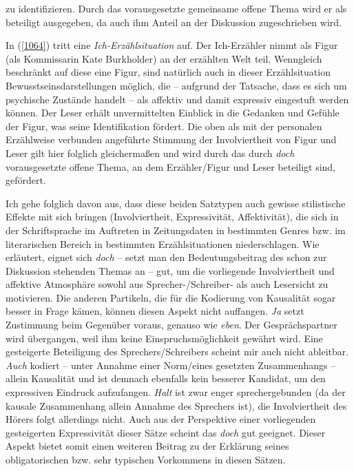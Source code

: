 {zu identifizieren. Durch das vorausgesetzte gemeinsame offene Thema wird er als beteiligt ausgegeben, da auch ihm Anteil an der Diskussion zugeschrieben wird.

In (\ref{1064}) tritt eine \textit{Ich-Erzählsituation} auf. Der  Ich-Erzähler nimmt als Figur (als Kommissarin Kate Burkholder) an der erzählten Welt teil. Wenngleich beschränkt auf diese eine Figur, sind natürlich auch in dieser Erzählsituation Bewusstseinsdarstellungen möglich, die – aufgrund der Tatsache, dass es sich um psychische Zustände handelt – als affektiv und damit expressiv eingestuft werden können. Der Leser erhält unvermittelten Einblick in die Gedanken und Gefühle der Figur, was seine Identifikation fördert. Die oben als mit der personalen Erzählweise verbunden angeführte Stimmung der Involviertheit von Figur und Leser gilt hier folglich gleichermaßen und wird durch das durch \textit{doch} vorausgesetzte offene Thema, an dem Erzähler/Figur und Leser beteiligt sind, gefördert.

Ich gehe folglich davon aus, dass diese beiden Satztypen auch gewisse stilistische Effekte mit sich bringen (Involviertheit, Expressivität, Affektivität), die sich in der Schriftsprache im Auftreten in Zeitungsdaten in bestimmten Genres bzw. im literarischen Bereich in bestimmten Erzählsituationen niederschlagen. Wie erläutert, eignet sich \textit{doch} – setzt man den Bedeutungsbeitrag des schon zur Diskussion stehenden Themas an – gut, um die vorliegende Involviertheit und affektive Atmosphäre sowohl aus Sprecher-/Schreiber- als auch Lesersicht zu motivieren. Die anderen Partikeln, die für die Kodierung von Kausalität sogar besser in Frage kämen, können diesen Aspekt nicht auffangen. \textit{Ja} setzt Zustimmung beim Gegenüber voraus, genauso wie \textit{eben}. Der Gesprächspartner wird übergangen, weil ihm keine Einspruchsmöglichkeit gewährt wird. Eine gesteigerte Beteiligung des Sprechers/Schreibers scheint mir auch nicht ableitbar. \textit{Auch} ko\-diert – unter Annahme einer Norm/eines gesetzten Zusammenhangs – allein Kausalität und ist demnach ebenfalls kein besserer Kandidat, um den expressiven Eindruck aufzufangen. \textit{Halt} ist zwar enger sprechergebunden (da der kausale Zusammenhang allein Annahme des Sprechers ist), die Involviertheit des Hörers folgt allerdings nicht. Auch aus der Perspektive einer vorliegenden gesteigerten Expressivität dieser Sätze scheint das \textit{doch} gut geeignet. Dieser Aspekt bietet somit einen weiteren Beitrag zu der Erklärung seines obligatorischen bzw. sehr typi\-schen Vorkommens in diesen Sätzen.
	
}
